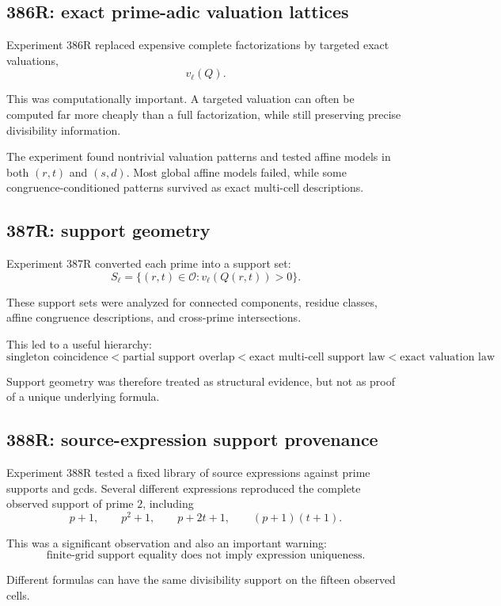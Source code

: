 \documentclass[11pt,a4paper]{article}
\begin{document}
\subsection{386R: exact prime-adic valuation lattices}

Experiment 386R replaced expensive complete factorizations by targeted exact valuations,
\[
v_\ell(Q).
\]

This was computationally important. A targeted valuation can often be computed far more cheaply than a full factorization, while still preserving precise divisibility information.

The experiment found nontrivial valuation patterns and tested affine models in both $(r,t)$ and $(s,d)$. Most global affine models failed, while some congruence-conditioned patterns survived as exact multi-cell descriptions.

\subsection{387R: support geometry}

Experiment 387R converted each prime into a support set:
\[
S_\ell=\{(r,t)\in\mathcal O:v_\ell(Q(r,t))>0\}.
\]

These support sets were analyzed for connected components, residue classes, affine congruence descriptions, and cross-prime intersections.

This led to a useful hierarchy:
\[
\boxed{
\text{singleton coincidence}
<
\text{partial support overlap}
<
\text{exact multi-cell support law}
<
\text{exact valuation law}
}.
\]

Support geometry was therefore treated as structural evidence, but not as proof of a unique underlying formula.

\subsection{388R: source-expression support provenance}

Experiment 388R tested a fixed library of source expressions against prime supports and gcds. Several different expressions reproduced the complete observed support of prime $2$, including
\[
p+1,\qquad p^2+1,\qquad p+2t+1,\qquad (p+1)(t+1).
\]

This was a significant observation and also an important warning:
\[
\boxed{
\text{finite-grid support equality does not imply expression uniqueness}.
}
\]

Different formulas can have the same divisibility support on the fifteen observed cells.
\end{document}
